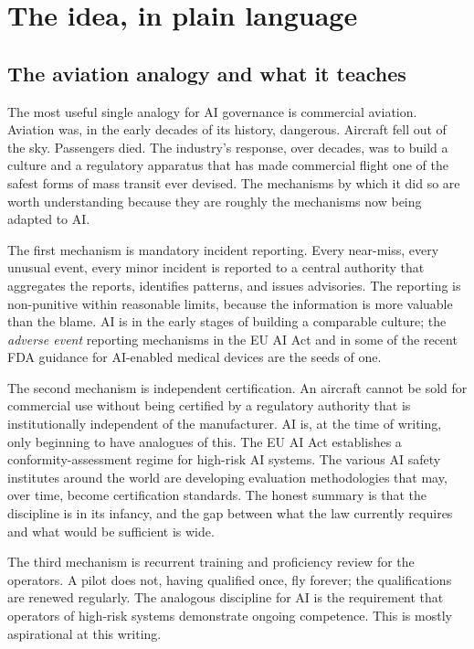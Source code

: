 \section{The idea, in plain language}

\subsection*{The aviation analogy and what it teaches}

The most useful single analogy for AI governance is
commercial aviation. Aviation was, in the early decades of
its history, dangerous. Aircraft fell out of the sky.
Passengers died. The industry's response, over decades, was
to build a culture and a regulatory apparatus that has made
commercial flight one of the safest forms of mass transit ever
devised. The mechanisms by which it did so are worth
understanding because they are roughly the mechanisms now
being adapted to AI.

The first mechanism is mandatory incident reporting. Every
near-miss, every unusual event, every minor incident is
reported to a central authority that aggregates the reports,
identifies patterns, and issues advisories. The reporting is
non-punitive within reasonable limits, because the
information is more valuable than the blame. AI is in the
early stages of building a comparable culture; the
\emph{adverse event} reporting mechanisms in the EU AI Act
and in some of the recent FDA guidance for AI-enabled
medical devices are the seeds of one.

The second mechanism is independent certification. An
aircraft cannot be sold for commercial use without being
certified by a regulatory authority that is institutionally
independent of the manufacturer. AI is, at the time of
writing, only beginning to have analogues of this. The EU AI
Act establishes a conformity-assessment regime for high-risk
AI systems. The various AI safety institutes around the world
are developing evaluation methodologies that may, over time,
become certification standards. The honest summary is that
the discipline is in its infancy, and the gap between what
the law currently requires and what would be sufficient is
wide.

The third mechanism is recurrent training and proficiency
review for the operators. A pilot does not, having qualified
once, fly forever; the qualifications are renewed regularly.
The analogous discipline for AI is the requirement that
operators of high-risk systems demonstrate ongoing
competence. This is mostly aspirational at this writing.

